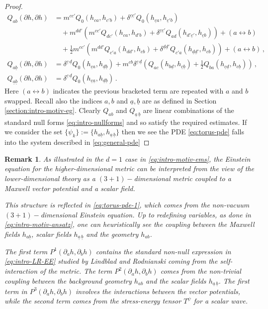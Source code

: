 \documentclass[11pt, a4paper]{amsart}
\numberwithin{equation}{section}
\newtheorem{remark}[theorem]{Remark}
\numberwithin{theorem}{section}
\newcommand{\p}{\partial}
\newcommand{\abar}{{\underline{a}}}
\newcommand{\bbar}{{\underline{b}}}
\newcommand{\cbar}{{\underline{c}}}
\newcommand{\dbar}{{\underline{d}}}
\newcommand{\abbar}{{\underline{a} \, \underline{b}}}
\begin{document}
\begin{proof}
\begin{align*}
Q_{ab}(\p h, \p h) &=   m^{c c'} Q_0 \left( h_{ca}, h_{c'b} \right) + \delta^{\cbar \cbar'} Q_0 \left( h_{\cbar a}, h_{\cbar 'b} \right) \\
& \quad + m^{dd'} \left( m^{cc'} Q_{dc'} (h_{ca}, h_{d'b}) + \delta^{\cbar \cbar'} Q_{ad} (h_{d' \cbar'} , h_{\cbar b} ) \right) + (a \leftrightarrow b) \\
& \quad + \frac{1}{2} m^{c c'} \left( m^{dd'} Q_{c' a} (h_{dd'}, h_{cb} ) + \delta^{\dbar \dbar'} Q_{c' a} ( h_{\dbar \dbar'}, h_{cb} ) \right) + (a \leftrightarrow b ) \,, \\
Q_{a \bbar}(\p h, \p h) &=  \delta^{\cbar \, \dbar} Q_0 ( h_{\cbar a}, h_{\dbar \bbar}) +  m^{cb} \delta^{\cbar \, \dbar} \left( Q_{ac}(h_{b\dbar}, h_{\cbar \bbar}) + \frac{1}{2} Q_{ba} (h_{\cbar \dbar}, h_{c \bbar}) \right) \,, \\
Q_{\abar \bbar}(\p h, \p h) &=  \delta^{\cbar \, \dbar} Q_0 (h_{\cbar \abar}, h_{\dbar \bbar} )\,.
\end{align*}
Here $(a \leftrightarrow b)$ indicates the previous bracketed term are repeated with $a$ and $b$ swapped. 
Recall also the indices $a,b$ and $\abar, \bbar$ are as defined in Section \ref{section:intro-motiv-eg}. Clearly $Q_{ab}$ and $Q_\abbar$ are linear combinations of the standard null forms \eqref{eq:intro-nullforms} and so satisfy the required estimates. If we consider the set $\{ \psi_k \} := \{ h_{a \bbar}, h_\abbar \}$ then we see the PDE \eqref{eq:torus-pde} falls into the system described in \eqref{eq:general-pde}
\end{proof}

\begin{remark}
As illustrated in the $d=1$ case in \eqref{eq:intro-motiv-ems}, the Einstein equation for the higher-dimensional metric can be interpreted from the view of the lower-dimensional theory as a $(3+1)-$dimensional metric coupled to a Maxwell vector potential and a scalar field. 

This structure is reflected in \eqref{eq:torus-pde-1}, which comes from the non-vacuum $(3+1)-$dimensional Einstein equation. Up to redefining variables, as done in \eqref{eq:intro-motiv-ansatz}, one can heuristically see the coupling between the Maxwell fields $h_{a \bbar}$, scalar fields $h_\abbar$ and the geometry $h_{ab}$. 

The first term $P^1(\p_a h, \p_b h)$ contains the standard non-null expression in \eqref{eq:intro-LR-EE} studied by Lindblad and Rodnianski coming from the self-interaction of the metric. 
The term $P^2(\p_a h, \p_b h)$ comes from the non-trivial coupling between the background geometry $h_{ab}$ and the scalar fields $h_\abbar$. 
The first term in $P^3(\p_a h, \p_b h)$ involves the interactions between the vector potentials, while the second term comes from the stress-energy tensor $T^\psi$ for a scalar wave. 
\end{remark}
\end{document}
